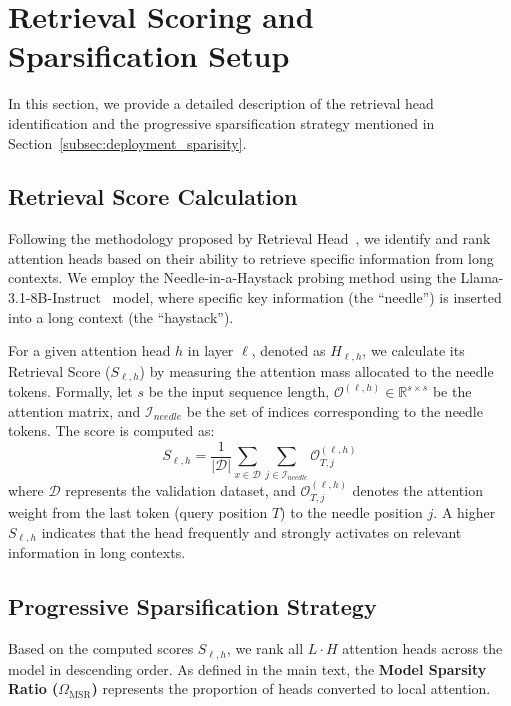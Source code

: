 

\section{Retrieval Scoring and Sparsification Setup}
\label{appendix:preliminary_settings}
In this section, we provide a detailed description of the retrieval head identification and the progressive sparsification strategy mentioned in Section~\ref{subsec:deployment_sparisity}.

\subsection{Retrieval Score Calculation}
Following the methodology proposed by Retrieval Head~\citep{wu2024retrieval}, we identify and rank attention heads based on their ability to retrieve specific information from long contexts.
We employ the Needle-in-a-Haystack probing method using the Llama-3.1-8B-Instruct~\citep{grattafiori2024llama} model, where specific key information (the ``needle'') is inserted into a long context (the ``haystack'').

For a given attention head $h$ in layer $\ell$, denoted as $H_{\ell,h}$, we calculate its Retrieval Score ($S_{\ell,h}$) by measuring the attention mass allocated to the needle tokens.
Formally, let $s$ be the input sequence length, $\mathcal{O}^{(\ell, h)} \in \mathbb{R}^{s \times s}$ be the attention matrix, and $\mathcal{I}_{needle}$ be the set of indices corresponding to the needle tokens. The score is computed as:
\begin{equation}
    S_{\ell,h} = \frac{1}{|\mathcal{D}|} \sum_{x \in \mathcal{D}} \sum_{j \in \mathcal{I}_{needle}} \mathcal{O}^{(\ell, h)}_{T, j}
\end{equation}
where $\mathcal{D}$ represents the validation dataset, and $\mathcal{O}^{(\ell, h)}_{T, j}$ denotes the attention weight from the last token (query position $T$) to the needle position $j$.
A higher $S_{\ell,h}$ indicates that the head frequently and strongly activates on relevant information in long contexts.

\subsection{Progressive Sparsification Strategy}
Based on the computed scores $S_{\ell,h}$, we rank all $L \cdot H$ attention heads across the model in descending order.
As defined in the main text, the \textbf{Model Sparsity Ratio ($\Omega_{\mathrm{MSR}}$)} represents the proportion of heads converted to local attention.

